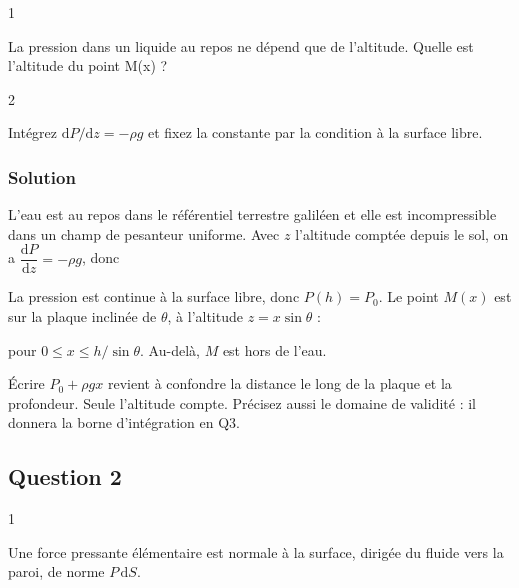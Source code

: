 \documentclass[11pt,a4paper]{article}
\newcommand{\equationajustee}[1]{%
  \sbox{\boiteequation}{$\displaystyle #1$}%
  \ifdim\wd\boiteequation>\linewidth
    \[\resizebox{\linewidth}{!}{\usebox{\boiteequation}}\]%
  \else
    \[#1\]%
  \fi}
\begin{document}
\begin{indication}{1}

La pression dans un liquide au repos ne dépend que de l'altitude. Quelle est l'altitude du point M(x) ?

\end{indication}

\begin{indication}{2}

Intégrez \(\mathrm dP/\mathrm dz=-\rho g\) et fixez la constante par la condition à la surface libre.

\end{indication}

\hypertarget{solution}{%
\subsubsection{Solution}\label{solution}}

L'eau est au repos dans le référentiel terrestre galiléen et elle est incompressible dans un champ de pesanteur uniforme. Avec \(z\) l'altitude comptée depuis le sol, on a \(\dfrac{\mathrm dP}{\mathrm dz}=-\rho g\), donc

\equationajustee{P(z)=P(h)+\rho g(h-z).}

La pression est continue à la surface libre, donc \(P(h)=P_0\). Le point \(M(x)\) est sur la plaque inclinée de \(\theta\), à l'altitude \(z=x\sin\theta\) :

\equationajustee{\boxed{P_{\text{eau}}(M)=P_0+\rho g\,(h-x\sin\theta)}}

pour \(0\le x\le h/\sin\theta\). Au-delà, \(M\) est hors de l'eau.

\begin{piege}

Écrire \(P_0+\rho g x\) revient à confondre la distance le long de la plaque et la profondeur. Seule l'altitude compte. Précisez aussi le domaine de validité : il donnera la borne d'intégration en Q3.

\end{piege}

\hypertarget{question-2}{%
\subsection{Question 2}\label{question-2}}

\begin{indication}{1}

Une force pressante élémentaire est normale à la surface, dirigée du fluide vers la paroi, de norme \(P\,\mathrm dS\).

\end{indication}
\end{document}
